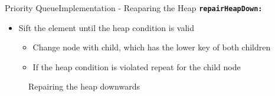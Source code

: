 \begin{frame}{Priority Queue}{Implementation - Reaparing the Heap}
  {\color{Mittel-Blau}\texttt{\textbf{repairHeapDown:}}}
  \begin{itemize}
    \item
      {\color{Mittel-Blau}Sift} the element until the
      {\color{Mittel-Blau}heap condition} is valid
      \begin{itemize}
        \item
          Change node with child, which has the lower key of both children
        \item
          If the {\color{Mittel-Blau}heap condition} is violated repeat for
          the child node
      \end{itemize}
  \end{itemize}
  \begin{center}
    \begin{figure}[!h]%
      \begin{columns}%
        \begin{column}{0.45\linewidth}%
          \begin{adjustbox}{width=\linewidth}%
          \end{adjustbox}%
        \end{column}%
        \begin{column}{0.45\linewidth}%
          \begin{adjustbox}{width=\linewidth}%
          \end{adjustbox}%
        \end{column}%
      \end{columns}%
      \caption{Repairing the heap downwards}%
      \label{fig:priority_queue:impl_repair_heap_down2}%
    \end{figure}
  \end{center}
\end{frame}


